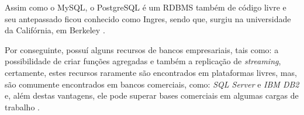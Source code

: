 Assim como o \acs{MySQL}, o \acs{PostgreSQL} é um \acs{RDBMS} também de
código livre e seu antepassado ficou conhecido como Ingres, sendo que, surgiu na
universidade da Califórnia, em Berkeley
\cite{postgreSQLIntroductionAndConcepts}.

Por conseguinte, possuí alguns recursos de bancos empresariais, tais como: a
possibilidade de criar funções agregadas e também a replicação de
\textit{streaming},  certamente, estes recursos raramente são encontrados em 
plataformas livres, mas, são comumente encontrados em bancos comerciais, como:
\textit{SQL Server} e \textit{IBM DB2} e, além destas vantagens, ele pode 
superar bases comerciais  em algumas cargas de trabalho 
\cite{postgreSQLUpAndRunning}.
